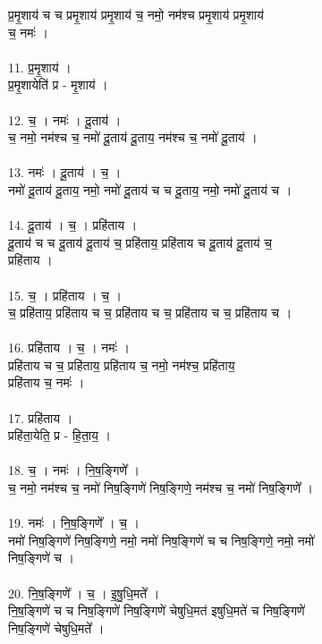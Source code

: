प्र॒मृ॒शाय॑ च च प्रमृ॒शाय॑ प्रमृ॒शाय॑ च॒ नमो॒ नम॑श्च प्रमृ॒शाय॑ प्रमृ॒शाय॑\\
च॒ नमः॑ ।\\
\\
11. प्र॒मृ॒शाय॑ ।\\
प्र॒मृ॒शायेति॑ प्र - मृ॒शाय॑ ।\\
\\
12. च॒ । नमः॑ । दू॒ताय॑ ।\\
च॒ नमो॒ नम॑श्च च॒ नमो॑ दू॒ताय॑ दू॒ताय॒ नम॑श्च च॒ नमो॑ दू॒ताय॑ ।\\
\\
13. नमः॑ । दू॒ताय॑ । च॒ ।\\
नमो॑ दू॒ताय॑ दू॒ताय॒ नमो॒ नमो॑ दू॒ताय॑ च च दू॒ताय॒ नमो॒ नमो॑ दू॒ताय॑ च ।\\
\\
14. दू॒ताय॑ । च॒ । प्रहि॑ताय ।\\
दू॒ताय॑ च च दू॒ताय॑ दू॒ताय॑ च॒ प्रहि॑ताय॒ प्रहि॑ताय च दू॒ताय॑ दू॒ताय॑ च॒\\
प्रहि॑ताय ।\\
\\
15. च॒ । प्रहि॑ताय । च॒ ।\\
च॒ प्रहि॑ताय॒ प्रहि॑ताय च च॒ प्रहि॑ताय च च॒ प्रहि॑ताय च च॒ प्रहि॑ताय च ।\\
\\
16. प्रहि॑ताय । च॒ । नमः॑ ।\\
प्रहि॑ताय च च॒ प्रहि॑ताय॒ प्रहि॑ताय च॒ नमो॒ नम॑श्च॒ प्रहि॑ताय॒\\
प्रहि॑ताय च॒ नमः॑ ।\\
\\
17. प्रहि॑ताय ।\\
प्रहि॑ता॒येति॒ प्र - हि॒ता॒य॒ ।\\
\\
18. च॒ । नमः॑ । नि॒ष॒ङ्गिणे᳚ ।\\
च॒ नमो॒ नम॑श्च च॒ नमो॑ निष॒ङ्गिणे॑ निष॒ङ्गिणे॒ नम॑श्च च॒ नमो॑ निष॒ङ्गिणे᳚ ।\\
\\
19. नमः॑ । नि॒ष॒ङ्गिणे᳚ । च॒ ।\\
नमो॑ निष॒ङ्गिणे॑ निष॒ङ्गिणे॒ नमो॒ नमो॑ निष॒ङ्गिणे॑ च च निष॒ङ्गिणे॒ नमो॒ नमो॑\\
निष॒ङ्गिणे॑ च ।\\
\\
20. नि॒ष॒ङ्गिणे᳚ । च॒ । इ॒षु॒धि॒मते᳚ ।\\
नि॒ष॒ङ्गिणे॑ च च निष॒ङ्गिणे॑ निष॒ङ्गिणे॑ चेषुधि॒मत॑ इषुधि॒मते॑ च निष॒ङ्गिणे॑\\
निष॒ङ्गिणे॑ चेषुधि॒मते᳚ ।\\
\\

